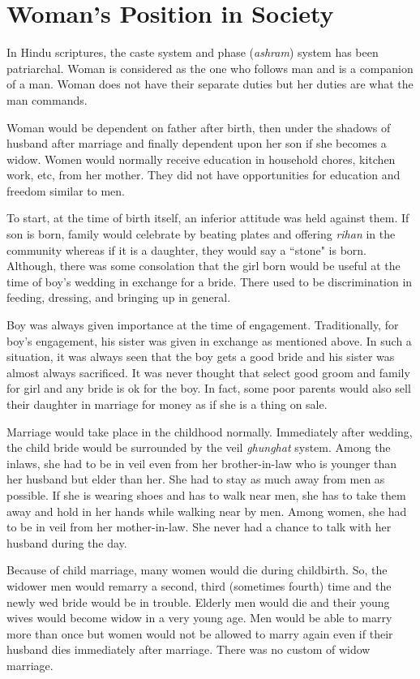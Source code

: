 \chapter{Woman's Position in Society}
In Hindu scriptures, the caste system and phase (\textit{ashram}) system has
been patriarchal. Woman is considered as the one who follows man and is a
companion of a man. Woman does not have their separate duties but her duties
are what the man commands.

Woman would be dependent on father after birth, then under the shadows of
husband after marriage and finally dependent upon her son if she becomes a
widow. Women would normally receive education in household chores, kitchen
work, etc, from her mother. They did not have opportunities for education and
freedom similar to men.

To start, at the time of birth itself, an inferior attitude was held against
them. If son is born, family would celebrate by beating plates and offering
\textit{rihan} in the community whereas if it is a daughter, they would say a
``stone" is born. Although, there was some consolation that the girl born would
be useful at the time of boy's wedding in exchange for a bride. There used to
be discrimination in feeding, dressing, and bringing up in general.

Boy was always given importance at the time of engagement. Traditionally, for
boy's engagement, his sister was given in exchange as mentioned above. In such
a situation, it was always seen that the boy gets a good bride and his sister
was almost always sacrificed. It was never thought that select good groom and
family for girl and any bride is ok for the boy. In fact, some poor parents
would also sell their daughter in marriage for money as if she is a thing on
sale.

Marriage would take place in the childhood normally. Immediately after wedding,
the child bride would be surrounded by the veil \textit{ghunghat} system. Among
the inlaws, she had to be in veil even from her brother-in-law who is younger
than her husband but elder than her. She had to stay as much away from men as
possible. If she is wearing shoes and has to walk near men, she has to take
them away and hold in her hands while walking near by men. Among women, she had
to be in veil from her mother-in-law. She never had a chance to talk with her
husband during the day.

Because of child marriage, many women would die during childbirth. So, the
widower men would remarry a second, third (sometimes fourth) time and the newly
wed bride would be in trouble. Elderly men would die and their young wives
would become widow in a very young age. Men would be able to marry more than
once but women would not be allowed to marry again even if their husband dies
immediately after marriage. There was no custom of widow marriage.

